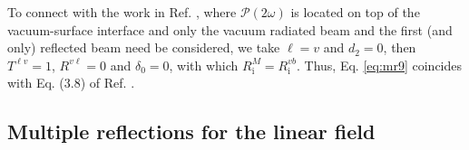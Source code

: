 To connect with the work in Ref. \cite{mizrahiJOSA88}, where
$\boldsymbol{\mathcal{P}}(2\omega)$ is located on top of the vacuum-surface
interface and only the vacuum radiated beam and the first (and only) reflected
beam need be considered, we take $\ell = v$ and $d_{2} = 0$, then $T^{\ell v} =
1$, $R^{v\ell} = 0$ and $\delta_{0} = 0$, with which $R^{M}_{\mathrm{i}} =
R^{vb}_{\mathrm{i}}$. Thus, Eq. \eqref{eq:mr9} coincides with Eq. (3.8) of Ref.
\cite{mizrahiJOSA88}.



\subsection{Multiple reflections for the linear field}

